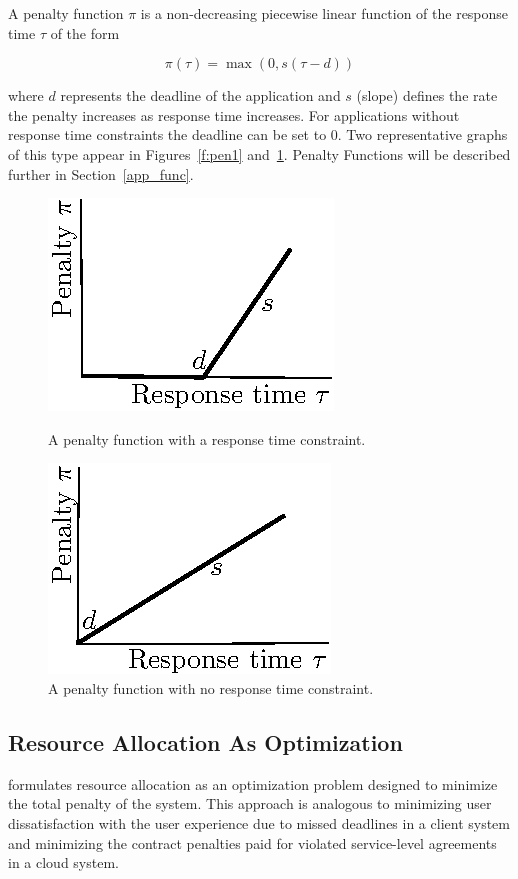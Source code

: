 A \pacora penalty function $\pi$ is a non-decreasing piecewise linear function of the response time $\tau$ of the form

\begin{equation}\label{pen_eq}
\pi(\tau) = \max(0, s(\tau - d))
\end{equation}

where $d$ represents the deadline of the application and $s$ (slope) defines the rate the penalty increases as response time increases. For applications without response time constraints the deadline can be set to $0$. Two representative graphs of this type appear in Figures~\ref{f:pen1} and~\ref{f:pen2}. Penalty Functions will be described further in Section~\ref{app_func}.

\begin{figure}[hb]
\parbox{1.6in}{
\includegraphics*{Penalty1.eps}
\caption{\label{f:pen1}A penalty function with a response time constraint.}
}
\hspace{\fill}
\parbox{1.6in}{
\includegraphics*{Penalty2.eps}
\caption{\label{f:pen2}A penalty function with no response time constraint.}
}
\end{figure}

\subsection*{Resource Allocation As Optimization}
\pacora formulates resource allocation as an optimization problem designed to minimize the total penalty of the system. This approach is analogous to minimizing user dissatisfaction with the user experience due to missed deadlines in a client system and minimizing the contract penalties paid for violated service-level agreements in a cloud system.

